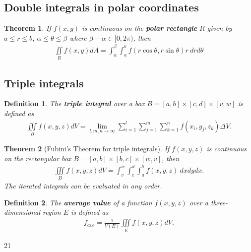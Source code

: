 \documentclass{article}
\theoremstyle{sltheorem}
\newtheorem{definition}{Definition}[section]
\newtheorem{theorem}{Theorem}[section]
\newcommand{\di}{\iint\limits}
\newcommand{\ti}{\iiint\limits}
\newcommand*\B[1]{\textbf{#1}}
\begin{document}
\subsection{Double integrals in polar coordinates}
\begin{theorem}
    If $f(x,y)$ is continuous on the \B{polar rectangle} $R$
    given by $a\leq r \leq b$, $\alpha \leq \theta\leq \beta$ where
    $\beta-\alpha \in [0,2\pi)$, then
    \begin{align*}
        \di_R f(x,y)dA = \int_\alpha^\beta \int_a^b
        f(r\cos\theta, r\sin\theta)r\:drd\theta
    \end{align*}
\end{theorem}
\subsection{Triple integrals} 
\begin{definition}
    The \B{triple integral} over a box $B=[a,b]\times[c,d]\times[v,w]$
    is defined as
    \begin{align*}
        \ti_B f(x,y,z)dV = \lim_{l,m,n\to\infty}\sum_{i=1}^l \sum_{j=1}^m \sum_{k=1}^n
        f(x_i,y_j,z_k)\Delta V.
    \end{align*}
\end{definition}
\begin{theorem}[Fubini's Theorem for triple integrals]
    If $f(x,y,z)$ is continuous on the rectangular box $B=[a,b]\times[b,c]\times[w,v]$,
    then 
    \begin{align*}
        \ti_B f(x,y,z) dV = \int_v^w\int_c^d \int_a^b f(x,y,z)\:dxdydx.
    \end{align*} 
    The iterated integrals can be evaluated in any order.
\end{theorem}
\begin{definition}
    The \B{average value} of a function $f(x,y,z)$ over a three-dimensional region $E$
    is defined as
    \begin{align*}
        f_{ave} = \frac{1}{V(E)}\ti_E f(x,y,z)dV.
    \end{align*} 
\end{definition}21
\end{document}

